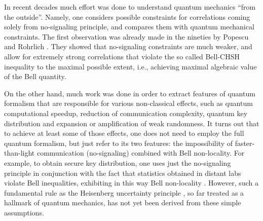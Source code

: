 \documentclass[pra,twocolumn,showpacs,preprintnumbers,amsmath,amssymb,superscriptaddress]{revtex4-1}
\begin{document}
\maketitle

In recent decades much effort was done to understand quantum mechanics ``from the outside''. Namely, one considers possible constraints
for correlations coming solely from no-signaling principle, and compares them with quantum mechanical constraints. The first observation was already made in the nineties by Popescu and Rohrlich \cite{PopescuRohrlich1994}. They showed that no-signaling constraints are much weaker, and allow for extremely strong correlations that violate the so called Bell-CHSH inequality \cite{Bell1964,CHSH1969} to the maximal possible extent, i.e., achieving maximal algebraic value of the Bell quantity.

On the other hand, much work was done in order to extract features of quantum formalism that are responsible for various non-classical effects, such as quantum computational speedup, reduction of communication complexity, quantum key distribution and expansion or amplification of weak randomness. It turns out that to achieve at least some of those effects, one does not need to employ the full quantum formalism, but just refer to its two features: the impossibility of faster-than-light communication (no-signaling) combined with Bell non-locality.
For example, to obtain secure key distribution, one uses just the no-signaling principle in conjunction with the fact that statistics obtained in distant labs violate Bell inequalities, exhibiting in this way Bell non-locality \cite{BarrettHardyKent2005}. However, such a fundamental rule as the Heisenberg uncertainty principle \cite{Heisenberg1927}, so far treated as a hallmark of quantum mechanics, has not yet been derived from these simple assumptions.
\end{document}
